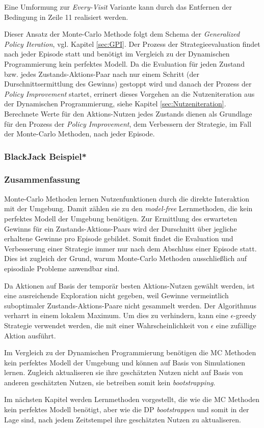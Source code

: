 Eine Umformung zur \textit{Every-Visit} Variante kann durch das Entfernen der Bedingung in Zeile 11 realisiert werden.
\par 
Dieser Ansatz der Monte-Carlo Methode folgt dem Schema der \textit{Generalized Policy Iteration}, vgl. Kapitel \ref{sec:GPI}. Der Prozess der Strategieevaluation findet nach jeder Episode statt und benötigt im Vergleich zu der Dynamischen Programmierung kein perfektes Modell. Da die Evaluation für jeden Zustand bzw. jedes Zustands-Aktions-Paar nach nur einem Schritt (der Durschnittsermittlung des Gewinns) gestoppt wird und danach der Prozess der \textit{Policy Improvement} startet, errinert dieses Vorgehen an die Nutzeniteration aus der Dynamischen Programmierung, siehe Kapitel \ref{sec:Nutzeniteration}.  Berechnete Werte für den Aktions-Nutzen jedes Zustands dienen als Grundlage für den Prozess der \textit{Policy Improvement}, dem Verbessern der Strategie, im Fall der Monte-Carlo Methoden, nach jeder Episode.
\subsubsection{BlackJack Beispiel*}

\subsubsection{Zusammenfassung}
Monte-Carlo Methoden lernen Nutzenfunktionen durch die direkte Interaktion mit der Umgebung. Damit zählen sie zu den \textit{model-free} Lernmethoden, die kein perfektes Modell der Umgebung benötigen. Zur Ermittlung des erwarteten Gewinns für ein Zustands-Aktions-Paars wird der Durschnitt über jegliche erhaltene Gewinne pro Episode gebildet. Somit findet die Evaluation und Verbesserung einer Strategie immer nur nach dem Abschluss einer Episode statt. Dies ist zugleich der Grund, warum Monte-Carlo Methoden ausschließlich auf episodiale Probleme anwendbar sind.
\par 
Da Aktionen auf Basis der temporär besten Aktions-Nutzen gewählt werden, ist eine ausreichende Exploration nicht gegeben, weil Gewinne vermeintlich suboptimaler Zustands-Aktions-Paare nicht gesammelt werden. Der Algorithmus verharrt in einem lokalem Maximum. Um dies zu verhindern, kann eine $\epsilon$-greedy Strategie verwendet werden, die mit einer Wahrscheinlichkeit von $\epsilon$ eine zufällige Aktion ausführt.
\par 
Im Vergleich zu der Dynamischen Programmierung benötigen die MC Methoden kein perfektes Modell der Umgebung und können auf Basis von Simulationen lernen. Zugleich aktualiseren sie ihre geschätzten Nutzen nicht auf Basis von anderen geschätzten Nutzen, sie betreiben somit kein \textit{bootstrapping}. 
\par 
Im nächsten Kapitel werden Lernmethoden vorgestellt, die wie die MC Methoden kein perfektes Modell benötigt, aber wie die DP \textit{bootstrappen} und somit in der Lage sind, nach jedem Zeitstempel ihre geschätzten Nutzen zu aktualiseren.